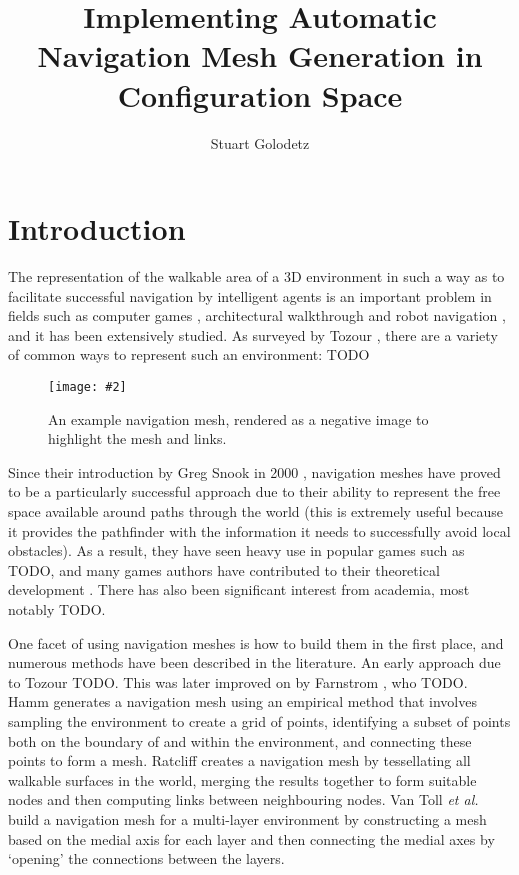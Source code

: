 \documentclass[10pt,onecolumn]{article}
\newcommand{\stufigex}[5]					%
{
	\begin{figure}[#5]
	\begin{center}
		\texttt{[image: \#2]}
		\caption{#3}
		\label{#4}
	\end{center}
	\end{figure}
}
\begin{document}
\title{Implementing Automatic Navigation Mesh Generation in Configuration Space}
\author{Stuart Golodetz}
\date{}
\maketitle

\section*{Introduction}

The representation of the walkable area of a 3D environment in such a way as to facilitate successful navigation by intelligent agents is an important problem in fields such as computer games \cite{?}, architectural walkthrough \cite{?} and robot navigation \cite{?}, and it has been extensively studied. As surveyed by Tozour \cite{tozour04}, there are a variety of common ways to represent such an environment: TODO

\stufigex{height=6cm}{blakeney-midramp-neg.png}{An example navigation mesh, rendered as a negative image to highlight the mesh and links.}{fig:1}{t}

Since their introduction by Greg Snook in 2000 \cite{snook00}, navigation meshes have proved to be a particularly successful approach due to their ability to represent the free space available around paths through the world (this is extremely useful because it provides the pathfinder with the information it needs to successfully avoid local obstacles). As a result, they have seen heavy use in popular games such as TODO, and many games authors have contributed to their theoretical development \cite{?}. There has also been significant interest from academia, most notably TODO.

One facet of using navigation meshes is how to build them in the first place, and numerous methods have been described in the literature. An early approach due to Tozour \cite{tozour02} TODO. This was later improved on by Farnstrom \cite{farnstrom06}, who TODO. Hamm \cite{hamm08} generates a navigation mesh using an empirical method that involves sampling the environment to create a grid of points, identifying a subset of points both on the boundary of and within the environment, and connecting these points to form a mesh. Ratcliff \cite{ratcliff08} creates a navigation mesh by tessellating all walkable surfaces in the world, merging the results together to form suitable nodes and then computing links between neighbouring nodes. Van Toll \emph{et al.} \cite{vantoll11} build a navigation mesh for a multi-layer environment by constructing a mesh based on the medial axis for each layer and then connecting the medial axes by `opening' the connections between the layers.
\end{document}
